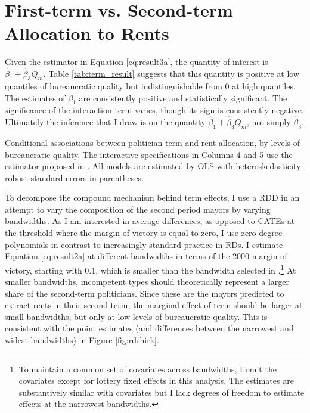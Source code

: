 \documentclass[11pt,english]{article}
\begin{document}
\section{First-term vs. Second-term Allocation to Rents}\label{app:shirking}

Given the estimator in Equation \ref{eq:result3a}, the quantity of interest is $\widehat{\beta}_1 + \widehat{\beta}_3 Q_m$. Table \ref{tab:term_result} suggests that this quantity is positive at low quantiles of bureaucratic quality but indistinguishable from 0 at high quantiles. The estimates of $\beta_1$ are consistently positive and statistically significant. The significance of the interaction term varies, though its sign is consistently negative. Ultimately the inference that I draw is on the quantity $\widehat{\beta}_1 + \widehat{\beta}_3 Q_m$, not simply $\widehat{\beta}_3$. \\

\begin{table}
\centering
\resizebox{.8\textwidth}{!}{
}
\caption{Conditional associations between politician term and rent allocation, by levels of bureaucratic quality. The interactive specifications in Columns 4 and 5 use the estimator proposed in \citet{lin2013}. All models are estimated by OLS with heteroskedasticity-robust standard errors in parentheses.}\label{tab:term_result}
\end{table}

To decompose the compound mechanism behind term effects, I use a RDD in an attempt to vary the composition of the second period mayors by varying bandwidths. As I am interested in average differences, as opposed to CATEs at the threshold where the margin of victory is equal to zero, I use zero-degree polynomials in contrast to increasingly standard practice in RDs. I estimate Equation \ref{eq:result2a} at different bandwidths in terms of the 2000 margin of victory, starting with 0.1, which is smaller than the bandwidth selected in \citep{ff2011}.\footnote{To maintain a common set of covariates across bandwidths, I omit the covariates except for lottery fixed effects in this analysis. The estimates are substantively similar with covariates but I lack degrees of freedom to estimate effects at the narrowest bandwidths.} At smaller bandwidths, incompetent types should theoretically represent a larger share of the second-term politicians. Since these are the mayors predicted to extract rents in their second term, the marginal effect of term should be larger at small bandwidths, but only at low levels of bureaucratic quality. This is consistent with the point estimates (and differences between the narrowest and widest bandwidths) in Figure \ref{fig:rdshirk}.
\end{document}

